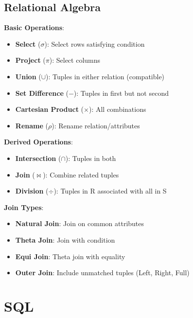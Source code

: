\documentclass[12pt,a4paper]{report}
\begin{document}
\subsection{Relational Algebra}
\begin{concept}
\textbf{Basic Operations}:
\begin{itemize}
    \item \textbf{Select} ($\sigma$): Select rows satisfying condition
    \item \textbf{Project} ($\pi$): Select columns
    \item \textbf{Union} ($\cup$): Tuples in either relation (compatible)
    \item \textbf{Set Difference} ($-$): Tuples in first but not second
    \item \textbf{Cartesian Product} ($\times$): All combinations
    \item \textbf{Rename} ($\rho$): Rename relation/attributes
\end{itemize}

\textbf{Derived Operations}:
\begin{itemize}
    \item \textbf{Intersection} ($\cap$): Tuples in both
    \item \textbf{Join} ($\bowtie$): Combine related tuples
    \item \textbf{Division} ($\div$): Tuples in R associated with all in S
\end{itemize}

\textbf{Join Types}:
\begin{itemize}
    \item \textbf{Natural Join}: Join on common attributes
    \item \textbf{Theta Join}: Join with condition
    \item \textbf{Equi Join}: Theta join with equality
    \item \textbf{Outer Join}: Include unmatched tuples (Left, Right, Full)
\end{itemize}
\end{concept}

\section{SQL}
\end{document}
